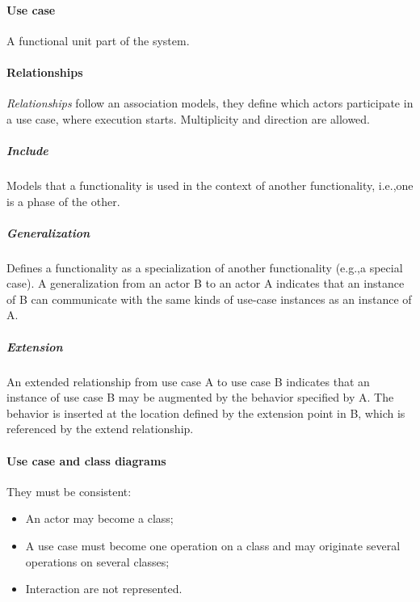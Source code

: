 \paragraph{Use case}
A functional unit part of the system.

\paragraph{Relationships}
\emph{Relationships} follow an association models, they define which actors participate in a use case, where execution starts. Multiplicity and direction are allowed.

\subparagraph{Include}
Models that a functionality is used in the context of another functionality, i.e.,\@ one is a phase of the other.

\subparagraph{Generalization}
Defines a functionality as a specialization of another functionality (e.g.,\@ a special case). A generalization from an actor B to an actor A indicates that an instance of B can communicate with the same kinds of use-case instances as an instance of A.

\subparagraph{Extension}
An extended relationship from use case A to use case B indicates that an instance of use case B may be augmented by the behavior specified by A. The behavior is inserted at the location defined by the extension point in B, which is referenced by the extend relationship.

\paragraph{Use case and class diagrams}
They must be consistent:
\begin{itemize}
\item An actor may become a class;
\item A use case must become one operation on a class and may originate several operations on several classes;
\item Interaction are not represented.
\end{itemize}